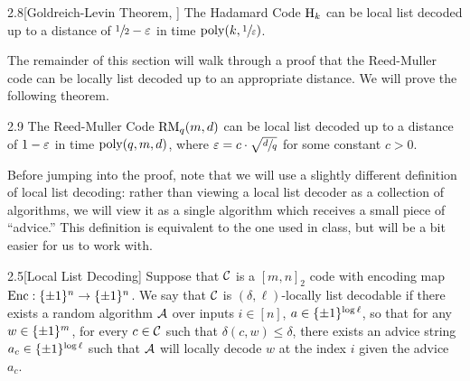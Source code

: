 \documentclass[11pt]{article}
\begin{document}
\begin{theorem}{2.8}[Goldreich-Levin Theorem, \cite{goldreichlevin}] \label{t-2-8}
    The Hadamard Code $\mathrm{H}_k$ can be local list decoded up to a distance of $\sfrac{1}{2} - \varepsilon$ in time $\mathrm{poly}(k, \sfrac{1}{\varepsilon})$.
\end{theorem}

The remainder of this section will walk through a proof that the Reed-Muller code can be locally list decoded up to an appropriate distance. We will prove the following theorem.

\begin{theorem}{2.9} \label{t-2-9}
    The Reed-Muller Code $\mathrm{RM}_q(m, d)$ can be local list decoded up to a distance of $1 - \varepsilon$ in time $\mathrm{poly}(q, m, d)$, where $\varepsilon = c \cdot \sqrt{\sfrac{d}{q}}$ for some constant $c > 0$.
\end{theorem}

Before jumping into the proof, note that we will use a slightly different definition of local list decoding: rather than viewing a local list decoder as a collection of algorithms, we will view it as a single algorithm which receives a small piece of ``advice.'' This definition is equivalent to the one used in class, but will be a bit easier for us to work with.

\begin{definition}{2.5}[Local List Decoding]
    Suppose that $\mathcal{C}$ is a $[m, n]_2$ code with encoding map $\mathrm{Enc} : \{\pm 1\}^{n} \rightarrow \{\pm 1\}^n$. We say that $\mathcal{C}$ is $(\delta, \ell)$-locally list decodable if there exists a random algorithm $\mathcal{A}$ over inputs $i \in [n]$, $a \in \{\pm 1\}^{\log \ell}$, so that for any $w \in \{\pm 1\}^m$, for every $c \in \mathcal{C}$ such that $\delta(c, w) \leq \delta$, there exists an advice string $a_c \in \{\pm 1\}^{\log \ell}$ such that $\mathcal{A}$ will locally decode $w$ at the index $i$ given the advice $a_c$.
\end{definition}
\end{document}
